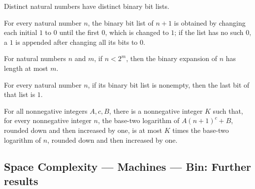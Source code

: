 \begin{lemma}
\label{Complexity.LogProg.bits_injective}
\leanok
{}
Distinct natural numbers have distinct binary bit lists.
\end{lemma}

\begin{lemma}
\label{Complexity.LogProg.bits_succ}
\leanok
{}
For every natural number $n$, the binary bit list of $n+1$ is obtained by changing each
initial $1$ to $0$ until the first $0$, which is changed to $1$; if the list has no such
$0$, a $1$ is appended after changing all its bits to $0$.
\end{lemma}

\begin{lemma}
\label{Complexity.LogProg.length_bits_le}
\leanok
{}
For natural numbers $n$ and $m$, if $n<2^m$, then the binary expansion of $n$ has length
at most $m$.
\end{lemma}

\begin{lemma}
\label{Complexity.LogProg.bits_getLast}
\leanok
{}
For every natural number $n$, if its binary bit list is nonempty, then the last bit of
that list is $1$.
\end{lemma}

\begin{lemma}
\label{Complexity.LogProg.log_poly_bound}
\leanok
{}
For all nonnegative integers $A,c,B$, there is a nonnegative integer $K$ such that, for
every nonnegative integer $n$, the base-two logarithm of $A(n+1)^c+B$, rounded down and
then increased by one, is at most $K$ times the base-two logarithm of $n$, rounded down
and then increased by one.
\end{lemma}

\subsection*{Space Complexity --- Machines --- Bin: Further results}

